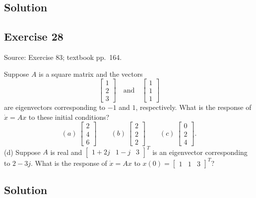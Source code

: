 \documentclass[12pt,a4paper]{article}
\newlength{\questionroom}
\newenvironment{questionprompt}{%
  \begin{lrbox}{\questionbox}\begin{minipage}{\linewidth}%
}{%
  \end{minipage}\end{lrbox}%
  \setlength{\questionroom}{\dimexpr\ht\questionbox+\dp\questionbox+5.2cm\relax}%
  \ifdim\questionroom>\textheight\setlength{\questionroom}{\textheight}\fi
  \Needspace{\questionroom}%
  \noindent\usebox{\questionbox}\par
}
\begin{document}
\subsection*{Solution}
\vspace{3.5cm}


\begin{questionprompt}
\section*{Exercise 28}
\label{practice:28}
{\small Source: Exercise 83; textbook pp.~164.}\par
Suppose $A$ is a square matrix and the vectors
\[\begin{bmatrix}1\\2\\3\end{bmatrix}\quad\text{and}\quad\begin{bmatrix}1\\1\\1\end{bmatrix}\]
are eigenvectors corresponding to $-1$ and $1$, respectively. What is the response of $\dot x=Ax$ to these initial conditions?
\[(a)\ \begin{bmatrix}2\\4\\6\end{bmatrix}\qquad
(b)\ \begin{bmatrix}2\\2\\2\end{bmatrix}\qquad
(c)\ \begin{bmatrix}0\\2\\4\end{bmatrix}.\]
(d) Suppose $A$ is real and $\begin{bmatrix}1+2j&1-j&3\end{bmatrix}^T$ is an eigenvector corresponding to $2-3j$. What is the response of $\dot x=Ax$ to $x(0)=\begin{bmatrix}1&1&3\end{bmatrix}^T$?
\end{questionprompt}
\subsection*{Solution}
\vspace{3.5cm}
\end{document}
